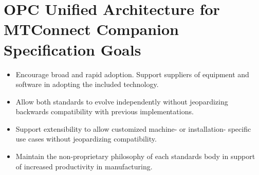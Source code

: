 \section{OPC Unified Architecture for MTConnect Companion Specification Goals}\label{goals}

\begin{itemize}
    \item Encourage broad and rapid adoption. Support suppliers of equipment and software in adopting the included technology.
    \item Allow both standards to evolve independently without jeopardizing backwards compatibility with previous implementations.
    \item Support extensibility to allow customized machine- or installation- specific use cases without jeopardizing compatibility.
    \item Maintain the non-proprietary philosophy of each standards body in support of increased productivity in manufacturing.

\end{itemize}
